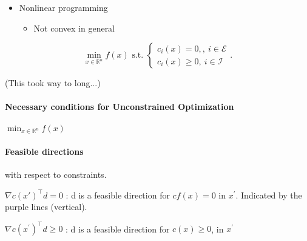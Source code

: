 \documentclass{article}
\begin{document}
\begin{minipage}[c]{0.3\textwidth}
  \raggedright
  \begin{itemize}
    \item Nonlinear programming
          \begin{itemize}
            \item Not convex in general
          \end{itemize}
  \end{itemize}
\end{minipage}
\begin{minipage}[c]{0.3\textwidth}
  \centering
  \[
    \min_{x\in \mathbb{R}^{n}} f(x) \text{ s.t. } \left\{
    \begin{aligned}
      c_i(x) = 0 , ,\ i \in\mathcal{E} \\
      c_i(x) \geq 0,\  i\in \mathcal{I}
    \end{aligned}
    \right.
    .\]
\end{minipage}
\begin{minipage}[c]{0.3\textwidth}
  \raggedleft
\end{minipage}

(This took way to long...)

\paragraph{Necessary conditions for Unconstrained Optimization} $\min_{x\in \mathbb{R}^{n}} f(x)$

\medskip
{}

\paragraph{Feasible directions} with respect to constraints.

\begin{minipage}[c]{0.5\textwidth}
\end{minipage}
\begin{minipage}[c]{0.5\textwidth}
  $\nabla c(x')^{\top}d = 0$ : d is a feasible direction for $cf(x) = 0$ in $x^{'}$. 
  Indicated by the purple lines (vertical). 
  
  \medskip $\nabla c(x^{'})^{\top}d \geq 0$ : d is a feasible direction for $c(x) \geq 0$, in $x^{'}$
\end{minipage}
\end{document}
